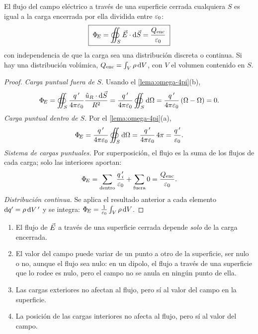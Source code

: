 \begin{teorema}\label{teo:gauss-integral}
El flujo del campo eléctrico a través de una superficie cerrada cualquiera $S$ es igual a la carga
encerrada por ella dividida entre $\varepsilon_{0}$:
\begin{equation}\label{eq:gauss-int}
  \boxed{\;\Phi_{\!E}=\oiint_{S}\vec{E}\cdot\mathrm{d}\vec{S}=\frac{Q_{\mathrm{enc}}}{\varepsilon_{0}}\;}
\end{equation}
con independencia de que la carga sea una distribución discreta o continua. Si hay una distribución volúmica,
$Q_{\mathrm{enc}}=\int_{V}\rho\,\mathrm{d} V$, con $V$ el volumen contenido en $S$.
\end{teorema}
\begin{proof}
\emph{Carga puntual fuera de $S$.} Usando el \cref{lema:omega-4pi}(b),
\[
  \Phi_{\!E}=\oiint_{S}\frac{q\,'}{4\pi\varepsilon_{0}}\frac{\hat{u}_{R}\cdot\mathrm{d}\vec{S}}{R^{2}}=\frac{q\,'}{4\pi\varepsilon_{0}}\oiint_{S}\mathrm{d}\Omega=\frac{q\,'}{4\pi\varepsilon_{0}}\,(\Omega-\Omega)=0 .
\]
\emph{Carga puntual dentro de $S$.} Por el \cref{lema:omega-4pi}(a),
\[
  \Phi_{\!E}=\frac{q\,'}{4\pi\varepsilon_{0}}\oiint_{S}\mathrm{d}\Omega=\frac{q\,'}{4\pi\varepsilon_{0}}\,4\pi=\frac{q\,'}{\varepsilon_{0}}.
\]
\emph{Sistema de cargas puntuales.} Por superposición, el flujo es la suma de los flujos de cada carga; solo las
interiores aportan:
\[
  \Phi_{\!E}=\sum_{\text{dentro}}\frac{q\,'_i}{\varepsilon_{0}}+\sum_{\text{fuera}}0=\frac{Q_{\mathrm{enc}}}{\varepsilon_{0}}.
\]
\emph{Distribución continua.} Se aplica el resultado anterior a cada elemento $\mathrm{d} q'=\rho\,\mathrm{d} V\,'$ y se integra:
$\Phi_{\!E}=\frac{1}{\varepsilon_{0}}\int_{V}\rho\,\mathrm{d} V$.
\end{proof}

\begin{observacion}\label{obs:alcance-gauss}
\begin{enumerate}[label=(\alph*)]
  \item El flujo de $\vec{E}$ a través de una superficie cerrada depende \emph{solo} de la carga encerrada.
  \item El valor del campo puede variar de un punto a otro de la superficie, ser nulo o no, aunque el flujo sea nulo: en un
        dipolo, el flujo a través de una superficie que lo rodee es nulo, pero el campo no se anula en ningún punto de ella.
  \item Las cargas exteriores no afectan al flujo, pero sí al valor del campo en la superficie.
  \item La posición de las cargas interiores no afecta al flujo, pero sí al valor del campo.
\end{enumerate}
\end{observacion}

